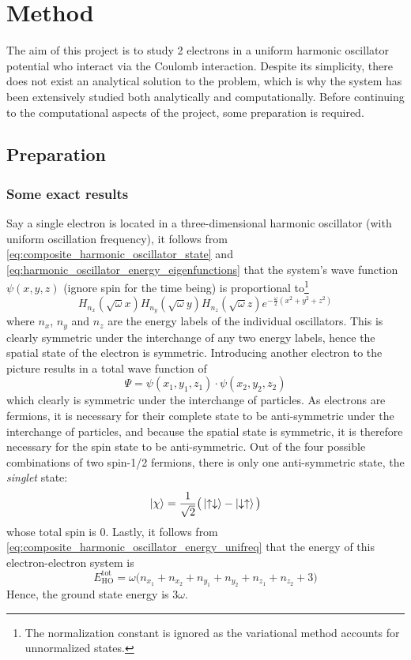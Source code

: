 \documentclass[nofootinbib,reprint,english]{revtex4-1}
\begin{document}
\section{Method}
The aim of this project is to study 2 electrons in a uniform harmonic oscillator potential who interact via the Coulomb interaction. Despite its simplicity, there does not exist an analytical solution to the problem, which is why the system has been extensively studied both analytically and computationally. Before continuing to the computational aspects of the project, some preparation is required.
\subsection{Preparation}
\subsubsection{Some exact results}
Say a single electron is located in a three-dimensional harmonic oscillator (with uniform oscillation frequency), it follows from \eqref{eq:composite_harmonic_oscillator_state} and \eqref{eq:harmonic_oscillator_energy_eigenfunctions} that the system's wave function \(\psi(x,y,z)\) (ignore spin for the time being) is proportional to\footnote{The normalization constant is ignored as the variational method accounts for unnormalized states.}
\begin{equation*}
H_{n_x}(\sqrt{\omega}x)H_{n_y}(\sqrt{\omega}y)H_{n_z}(\sqrt{\omega}z)e^{-\displaystyle\frac{\omega}{2}(x^2+y^2+z^2)}
\end{equation*}
where \(n_x\), \(n_y\) and \(n_z\) are the energy labels of the individual oscillators. This is clearly symmetric under the interchange of any two energy labels, hence the spatial state of the electron is symmetric. Introducing another electron to the picture results in a total wave function of
\[\Psi=\psi(x_1,y_1,z_1)\cdot\psi(x_2,y_2,z_2)\]
which clearly is symmetric under the interchange of particles. As electrons are fermions, it is necessary for their complete state to be anti-symmetric under the interchange of particles, and because the spatial state is symmetric, it is therefore necessary for the spin state to be anti-symmetric. Out of the four possible combinations of two spin-1/2 fermions, there is only one anti-symmetric state, the \emph{singlet} state:
\[\ket{\chi}=\frac{1}{\sqrt{2}}\big(\ket{\uparrow\downarrow}-\ket{\downarrow\uparrow}\big)\]
whose total spin is 0. Lastly, it follows from \eqref{eq:composite_harmonic_oscillator_energy_unifreq} that the energy of this electron-electron system is
\begin{equation}
E_\text{HO}^\text{tot}=\omega\big(n_{x_1}+n_{x_2}+n_{y_1}+n_{y_2}+n_{z_1}+n_{z_2}+3\big)
\end{equation}
Hence, the ground state energy is \(3\omega\).
\end{document}
